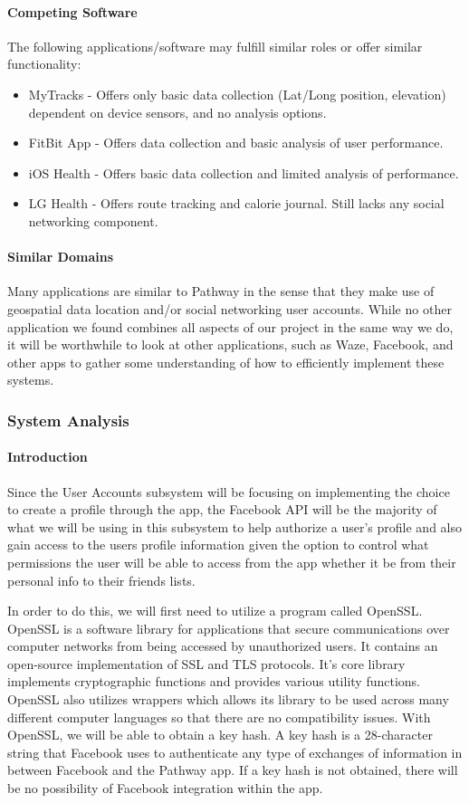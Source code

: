\documentclass{article}
\begin{document}
\paragraph{Competing Software}
The following applications/software may fulfill similar roles or offer similar functionality:
\begin{itemize}
    \item MyTracks - Offers only basic data collection (Lat/Long position, elevation) dependent on device sensors, and no analysis options.
    \item FitBit App - Offers data collection and basic analysis of user performance.
    \item iOS Health - Offers basic data collection and limited analysis of performance.
    \item LG Health - Offers route tracking and calorie journal. Still lacks any social networking component.
\end{itemize}

\paragraph{Similar Domains}
Many applications are similar to Pathway in the sense that they make use of geospatial data location and/or social networking user accounts. While no other application we found combines all aspects of our project in the same way we do, it will be worthwhile to look at other applications, such as Waze, Facebook, and other apps to gather some understanding of how to efficiently implement these systems.

\subsubsection{System Analysis}
\paragraph{Introduction}
Since the User Accounts subsystem will be focusing on implementing the choice to create a profile through the app, the Facebook API will be the majority of what we will be using in this subsystem to help authorize a user’s profile and also gain access to the users profile information given the option to control what permissions the user will be able to access from the app whether it be from their personal info to their friends lists.

In order to do this, we will first need to utilize a program called OpenSSL. OpenSSL is a software library for applications that secure communications over computer networks from being accessed by unauthorized users. It contains an open-source implementation of SSL and TLS protocols. It's core library implements cryptographic functions and provides various utility functions. OpenSSL also utilizes wrappers which allows its library to be used across many different computer languages so that there are no compatibility issues. With OpenSSL, we will be able to obtain a key hash. A key hash is a 28-character string that Facebook uses to authenticate any type of exchanges of information in between Facebook and the Pathway app. If a key hash is not obtained, there will be no possibility of Facebook integration within the app.
\end{document}
